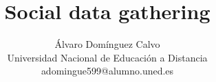 \documentclass[12pt, a4paper]{article}
\title{Social data gathering}
\author{Álvaro Domínguez Calvo \\ 
	Universidad Nacional de Educación a Distancia \\
adomingue599@alumno.uned.es}
\begin{document}
\date{}
\maketitle

\newpage
\tableofcontents

\newpage
\listoffigures

\newpage
\newpage









 


\end{document}
